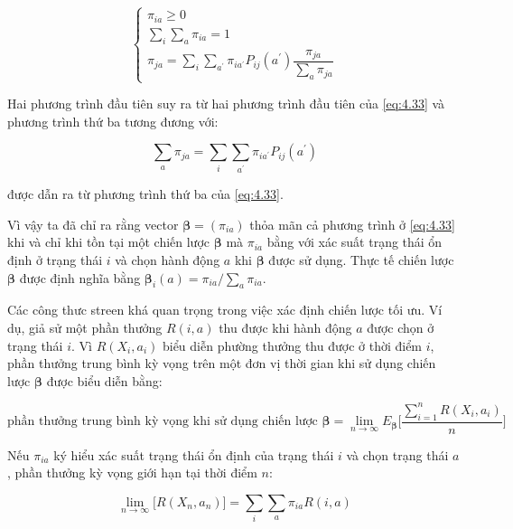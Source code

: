 \documentclass[14pt, a4paper]{article}
\numberwithin{equation}{section}
\numberwithin{figure}{section}
\theoremstyle{sltheorem}
\theoremstyle{soltheorem}
\numberwithin{dl}{section}
\numberwithin{md}{section}
\numberwithin{vd}{section}
\begin{document}
    \begin{equation*}
        \begin{cases}
            \pi_{ia} \geq 0 \\
            \sum_i \sum_a \pi_{ia} = 1 \\
            \pi_{ja} = \sum_i \sum_{a^{\prime}} \pi_{ia^{\prime}} P_{ij} (a^{\prime}) \dfrac{\pi_{ja}}{\sum_a \pi_{ja}}
        \end{cases}
    \end{equation*}

    Hai phương trình đầu tiên suy ra từ hai phương trình đầu tiên của \ref{eq:4.33} và phương trình thứ ba tương đương với:

    \begin{equation*}
        \sum_a \pi_{ja} = \sum_i \sum_{a^{\prime}} \pi_{ia^{\prime}} P_{ij}(a^{\prime})
    \end{equation*}

    được dẫn ra từ phương trình thứ ba của \ref{eq:4.33}.

    Vì vậy ta đã chỉ ra rằng vector $\boldsymbol{\beta}=(\pi_{ia})$ thỏa mãn cả phương trình ở \ref{eq:4.33} khi và chỉ khi tồn tại một chiến lược $\boldsymbol{\beta}$ mà $\pi_{ia}$ bằng với xác suất trạng thái ổn định ở trạng thái $i$ và chọn hành động $a$ khi $\boldsymbol{\beta}$ được sử dụng.
    Thực tế chiến lược $\boldsymbol{\beta}$ được định nghĩa bằng $\boldsymbol{\beta}_i (a) = \pi_{ia} / \sum_a \pi_{ia}$.

    Các công thưc streen khá quan trọng trong việc xác định chiến lược tối ưu.
    Ví dụ, giả sử một phần thưởng $R(i, a)$ thu được khi hành động $a$ được chọn ở trạng thái $i$.
    Vì $R(X_i, a_i)$ biểu diễn phường thưởng thu được ở thời điểm $i$, phần thưởng trung bình kỳ vọng trên một đơn vị thời gian khi sử dụng chiến lược $\boldsymbol{\beta}$ được biểu diễn bằng:

    \begin{equation*}
        \text{phần thưởng trung bình kỳ vọng khi sử dụng chiến lược } \boldsymbol{\beta} = \lim_{n \rightarrow \infty} E_{\boldsymbol{\beta}} \Bigg \lbrack \dfrac{\sum_{i=1}^n R(X_i, a_i)}{n} \Bigg \rbrack
    \end{equation*}

    Nếu $\pi_{ia}$ ký hiểu xác suất trạng thái ổn định của trạng thái $i$ và chọn trạng thái $a$, phần thưởng kỳ vọng giới hạn tại thời điểm $n$:

    \begin{equation*}
        \lim_{n \rightarrow \infty} \lbrack R(X_n, a_n) \rbrack = \sum_i \sum_a \pi_{ia} R(i, a)
    \end{equation*}
\end{document}
